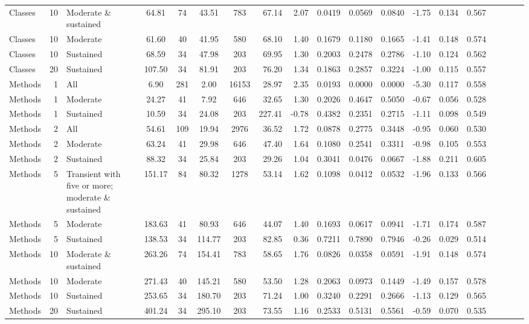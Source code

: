\begin{table}[H]
{\begin{tabular}{l r p{4cm} c c c c r r r r r r r r r r r r}
Classes & 10 & Moderate \& sustained &  64.81 & 74 & 43.51 & 783 & 67.14 & 2.07 & 0.0419 & 0.0569 & 0.0840 & -1.75 & 0.134 & 0.567 \\ 
Classes & 10 & Moderate &  61.60 & 40 & 41.95 & 580 & 68.10 & 1.40 & 0.1679 & 0.1180 & 0.1665 & -1.41 & 0.148 & 0.574 \\ 
Classes & 10 & Sustained &  68.59 & 34 & 47.98 & 203 & 69.95 & 1.30 & 0.2003 & 0.2478 & 0.2786 & -1.10 & 0.124 & 0.562 \\ 
Classes & 20 & Sustained &  107.50 & 34 & 81.91 & 203 & 76.20 & 1.34 & 0.1863 & 0.2857 & 0.3224 & -1.00 & 0.115 & 0.557 \\ 
Methods & 1 & All &  6.90 & 281 & 2.00 & 16153 & 28.97 & 2.35 & 0.0193 & 0.0000 & 0.0000 & -5.30 & 0.117 & 0.558 \\ 
Methods & 1 & Moderate &  24.27 & 41 & 7.92 & 646 & 32.65 & 1.30 & 0.2026 & 0.4647 & 0.5050 & -0.67 & 0.056 & 0.528 \\ 
Methods & 1 & Sustained &  10.59 & 34 & 24.08 & 203 & 227.41 & -0.78 & 0.4382 & 0.2351 & 0.2715 & -1.11 & 0.098 & 0.549 \\ 
Methods & 2 & All &  54.61 & 109 & 19.94 & 2976 & 36.52 & 1.72 & 0.0878 & 0.2775 & 0.3448 & -0.95 & 0.060 & 0.530 \\ 
Methods & 2 & Moderate &  63.24 & 41 & 29.98 & 646 & 47.40 & 1.64 & 0.1080 & 0.2541 & 0.3311 & -0.98 & 0.105 & 0.553 \\ 
Methods & 2 & Sustained &  88.32 & 34 & 25.84 & 203 & 29.26 & 1.04 & 0.3041 & 0.0476 & 0.0667 & -1.88 & 0.211 & 0.605 \\ 
Methods & 5 & Transient with five or more; moderate \& sustained &  151.17 & 84 & 80.32 & 1278 & 53.14 & 1.62 & 0.1098 & 0.0412 & 0.0532 & -1.96 & 0.133 & 0.566 \\ 
Methods & 5 & Moderate &  183.63 & 41 & 80.93 & 646 & 44.07 & 1.40 & 0.1693 & 0.0617 & 0.0941 & -1.71 & 0.174 & 0.587 \\ 
Methods & 5 & Sustained &  138.53 & 34 & 114.77 & 203 & 82.85 & 0.36 & 0.7211 & 0.7890 & 0.7946 & -0.26 & 0.029 & 0.514 \\ 
Methods & 10 & Moderate \& sustained &  263.26 & 74 & 154.41 & 783 & 58.65 & 1.76 & 0.0826 & 0.0358 & 0.0591 & -1.91 & 0.148 & 0.574 \\ 
Methods & 10 & Moderate &  271.43 & 40 & 145.21 & 580 & 53.50 & 1.28 & 0.2063 & 0.0973 & 0.1449 & -1.49 & 0.157 & 0.578 \\ 
Methods & 10 & Sustained &  253.65 & 34 & 180.70 & 203 & 71.24 & 1.00 & 0.3240 & 0.2291 & 0.2666 & -1.13 & 0.129 & 0.565 \\ 
Methods & 20 & Sustained &  401.24 & 34 & 295.10 & 203 & 73.55 & 1.16 & 0.2533 & 0.5131 & 0.5561 & -0.59 & 0.070 & 0.535 \\ 
\bottomrule
\end{tabular}%
} 
\end{table}
\newpage 
